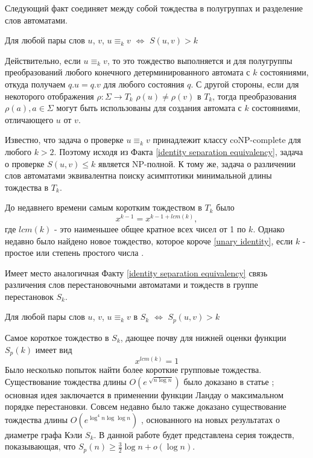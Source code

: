 Следующий факт соединяет между собой тождества в полугруппах и разделение слов автоматами.

\begin{fact} \label{identity separation equivalency}
	Для любой пары слов $u$, $v$, $u \equiv_k v$ $ \iff $ $S(u, v) > k$
\end{fact}

Действительно, если $u \equiv_k v$, то это тождество выполняется и для полугруппы преобразований любого конечного детерминированного автомата с $k$ состояниями, откуда получаем $q.u = q.v$ для любого состояния $q$. С другой стороны, если для некоторого отображения $\rho: \Sigma \rightarrow T_k$ $\rho(u) \ne \rho(v)$ в $T_k$, тогда преобразования $\rho(a), a \in \Sigma$ могут быть использованы для создания автомата с $k$ состояниями, отличающего $u$ от $v$.

Известно, что задача о проверке $u \equiv_k v$ принадлежит классу coNP-complete для любого $k > 2$. Поэтому исходя из Факта \ref{identity separation equivalency}, задача о проверке $S(u, v) \le k$ является NP-полной. К тому же, задача о различении слов автоматами эквивалентна поиску асимптотики минимальной длины тождества в $T_k$.

До недавнего времени самым коротким тождеством в $T_k$ было 
\begin{equation} \label{unary identity}
	x^{k-1} = x^{k-1+lcm(k)},
\end{equation} 
где $lcm(k)$ - это наименьшее общее кратное всех чисел от 1 по $k$. Однако недавно было найдено новое тождество, которое короче \ref{unary identity}, если $k$ - простое или степень простого числа \cite{lower bounds}.

Имеет место аналогичная Факту \ref{identity separation equivalency} связь различения слов перестановочными автоматами и тождеств в группе перестановок $S_k$.

\begin{fact}
	Для любой пары слов $u$, $v$, $u \equiv_k v$ в $S_k$ $ \iff $ $S_p(u, v) > k$
\end{fact}

Самое короткое тождество в $S_k$, дающее почву для нижней оценки функции $S_p(k)$ имеет вид 
$$
	x^{lcm(k)} = 1
$$
Было несколько попыток найти более короткие групповые тождества. Существование тождества длины $O(e^{\sqrt[]{n \log n}})$ было доказано в статье \cite{short group identity 1}; основная идея заключается в применении функции Ландау о максимальном порядке перестановки. Совсем недавно было также доказано существование тождества длины $O(e^{\log^4 n \log \log n})$ \cite{short group identity diameter of Caleys graph}, основанного на новых результатах о диаметре графа Кэли $S_k$. В данной работе будет представлена серия тождеств, показывающая, что $S_p(n) \ge \frac{3}{2}\log n + o(\log n)$.

